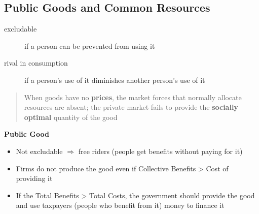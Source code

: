 \documentclass{article}
\begin{document}
\begin{multicols}{2}
\subsection{Public Goods and Common Resources}
\begin{description}
	\item[excludable] if a person can be prevented from using it
	\item[rival in consumption] if a person's use of it diminishes another person's use of it
\end{description}
\begin{quotation}
	When goods have no \textbf{prices}, the market forces that normally allocate resources are absent; the private market fails to provide the \textbf{socially optimal} quantity of the good
\end{quotation}
\begin{center}
	\begin{table}[H]
	\end{table}
\end{center}
\textbf{Public Good}
\begin{itemize}
	\item Not excludable $\Rightarrow$ free riders (people get benefits without paying for it)
	\item Firms do not produce the good even if Collective Benefits > Cost of providing it
	\item If the Total Benefits > Total Costs, the government should provide the good and use taxpayers (people who benefit from it) money to finance it

\end{itemize}
\end{multicols}
\end{document}
